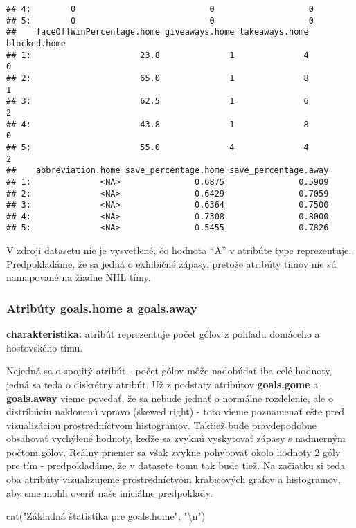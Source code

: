 \documentclass[
]{article}
\newenvironment{Shaded}{\begin{snugshade}}{\end{snugshade}}
\newcommand{\FunctionTok}[1]{\textcolor[rgb]{0.00,0.00,0.00}{#1}}
\newcommand{\NormalTok}[1]{#1}
\newcommand{\SpecialCharTok}[1]{\textcolor[rgb]{0.00,0.00,0.00}{#1}}
\newcommand{\StringTok}[1]{\textcolor[rgb]{0.31,0.60,0.02}{#1}}
\begin{document}
\begin{verbatim}
## 4:        0                           0                   0
## 5:        0                           0                   0
##    faceOffWinPercentage.home giveaways.home takeaways.home blocked.home
## 1:                      23.8              1              4            0
## 2:                      65.0              1              8            1
## 3:                      62.5              1              6            2
## 4:                      43.8              1              8            0
## 5:                      55.0              4              4            2
##    abbreviation.home save_percentage.home save_percentage.away
## 1:              <NA>               0.6875               0.5909
## 2:              <NA>               0.6429               0.7059
## 3:              <NA>               0.6364               0.7500
## 4:              <NA>               0.7308               0.8000
## 5:              <NA>               0.5455               0.7826
\end{verbatim}

V zdroji datasetu nie je vysvetlené, čo hodnota ``A'' v atribúte type
reprezentuje. Predpokladáme, že sa jedná o exhibičné zápasy, pretože
atribúty tímov nie sú namapované na žiadne NHL tímy.

\hypertarget{atribuxfaty-goals.home-a-goals.away}{%
\subsubsection{Atribúty goals.home a
goals.away}\label{atribuxfaty-goals.home-a-goals.away}}

\textbf{charakteristika:} atribút reprezentuje počet gólov z pohľadu
domáceho a hosťovského tímu.

Nejedná sa o spojitý atribút - počet gólov môže nadobúdať iba celé
hodnoty, jedná sa teda o diskrétny atribút. Už z podstaty atribútov
\textbf{goals.gome} a \textbf{goals.away} vieme povedať, že sa nebude
jednať o normálne rozdelenie, ale o distribúciu naklonenú vpravo (skewed
right) - toto vieme poznamenať ešte pred vizualizáciou prostredníctvom
histogramov. Taktiež bude pravdepodobne obsahovať vychýlené hodnoty,
keďže sa zvyknú vyskytovať zápasy s nadmerným počtom gólov. Reálny
priemer sa však zvykne pohybovať okolo hodnoty 2 góly pre tím -
predpokladáme, že v datasete tomu tak bude tiež. Na začiatku si teda oba
atribúty vizualizujeme prostredníctvom krabicových grafov a histogramov,
aby sme mohli overiť naše iniciálne predpoklady.

\begin{Shaded}
\begin{Highlighting}[]
\FunctionTok{cat}\NormalTok{(}\StringTok{"Základná štatistika pre goals.home"}\NormalTok{, }\StringTok{"}\SpecialCharTok{\textbackslash{}n}\StringTok{"}\NormalTok{)}
\end{Highlighting}
\end{Shaded}
\end{document}
